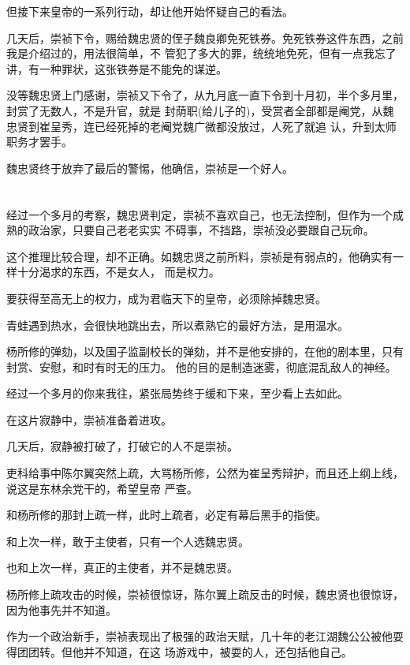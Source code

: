 \documentclass[11pt,a4paper,onecolumn]{article}
\begin{document}
但接下来皇帝的一系列行动，却让他开始怀疑自己的看法。

几天后，崇祯下令，赐给魏忠贤的侄子魏良卿免死铁券。免死铁券这件东西，之前我是介绍过的，用法很简单，不
管犯了多大的罪，统统地免死，但有一点我忘了讲，有一种罪状，这张铁券是不能免的\myrule 谋逆。

没等魏忠贤上门感谢，崇祯又下令了，从九月底一直下令到十月初，半个多月里，封赏了无数人，不是升官，就是
封荫职(给儿子的)，受赏者全部都是阉党，从魏忠贤到崔呈秀，连已经死掉的老阉党魏广微都没放过，人死了就追
认，升到太师职务才罢手。

魏忠贤终于放弃了最后的警惕，他确信，崇祯是一个好人。

\section[\thesection]{}

经过一个多月的考察，魏忠贤判定，崇祯不喜欢自己，也无法控制，但作为一个成熟的政治家，只要自己老老实实
不碍事，不挡路，崇祯没必要跟自己玩命。

这个推理比较合理，却不正确。如魏忠贤之前所料，崇祯是有弱点的，他确实有一样十分渴求的东西，不是女人，
而是权力。

要获得至高无上的权力，成为君临天下的皇帝，必须除掉魏忠贤。

青蛙遇到热水，会很快地跳出去，所以煮熟它的最好方法，是用温水。

杨所修的弹劾，以及国子监副校长的弹劾，并不是他安排的，在他的剧本里，只有封赏、安慰，和时有时无的压力。
他的目的是制造迷雾，彻底混乱敌人的神经。

经过一个多月的你来我往，紧张局势终于缓和下来，至少看上去如此。

在这片寂静中，崇祯准备着进攻。

几天后，寂静被打破了，打破它的人不是崇祯。

吏科给事中陈尔翼突然上疏，大骂杨所修，公然为崔呈秀辩护，而且还上纲上线，说这是东林余党干的，希望皇帝
严查。

和杨所修的那封上疏一样，此时上疏者，必定有幕后黑手的指使。

和上次一样，敢于主使者，只有一个人选\myrule 魏忠贤。

也和上次一样，真正的主使者，并不是魏忠贤。

杨所修上疏攻击的时候，崇祯很惊讶，陈尔翼上疏反击的时候，魏忠贤也很惊讶，因为他事先并不知道。

作为一个政治新手，崇祯表现出了极强的政治天赋，几十年的老江湖魏公公被他耍得团团转。但他并不知道，在这
场游戏中，被耍的人，还包括他自己。
\end{document}
